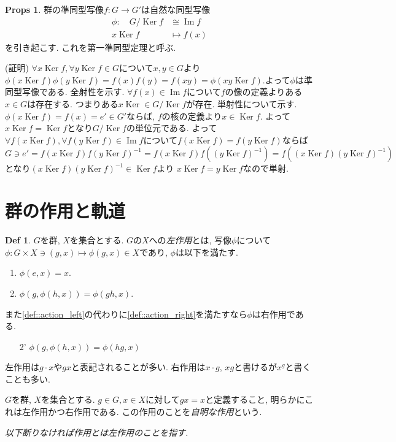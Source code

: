 \documentclass[dvipdfmx]{jsarticle}
\theoremstyle{definition}
\newtheorem{props}{Props}
\newtheorem{definition}{Def}
\numberwithin{equation}{section}
\numberwithin{props}{section}
\numberwithin{definition}{section}
\numberwithin{note}{section}
\DeclareMathOperator{\Ker}{Ker}
\DeclareMathOperator{\Image}{Im}
\begin{document}
\begin{props}
     群の準同型写像$f\colon G\to G'$は自然な同型写像
     \begin{align}
          \phi:\quad G/\Ker f & \cong \Image f \\
          x\Ker f             & \mapsto f(x)
     \end{align}
     を引き起こす. これを第一準同型定理と呼ぶ.
\end{props}
(証明) $\forall x\Ker f , \forall y\Ker f \in G$について$x,y\in G$より$\phi( x\Ker f)\phi( y\Ker f)=f(x)f(y)=f(xy)=\phi( xy\Ker f)$.よって$\phi$は準同型写像である. 全射性を示す. $\forall f(x)\in \Image f$について$f$の像の定義よりある$x\in G$は存在する. つまりある$x\Ker \in G/\Ker f$が存在. 単射性について示す.
$\phi(x\Ker f)=f(x)=e'\in G'$ならば, $f$の核の定義より$x\in \Ker f$. よって$x\Ker f=\Ker f$となり$G/\Ker f$の単位元である. よって$\forall f(x\Ker f),\forall f(y\Ker f)\in \Image f$について$f(x\Ker f)=f(y\Ker f)$ならば
$G\ni e'=f(x\Ker f)f(y\Ker f)^{-1}=f(x\Ker f)f((y\Ker f)^{-1})=f((x\Ker f)(y\Ker f)^{-1})$となり$(x\Ker f)(y\Ker f)^{-1}\in \Ker f$より $x\Ker f= y\Ker f$なので単射.
\section{群の作用と軌道}
\begin{definition}
     $G$を群, $X$を集合とする. $G$の$X$への\emph{左作用}とは, 写像$\phi$について$\phi\colon G\times X\ni (g,x)\mapsto \phi(g,x)\in X$であり, $\phi$は以下を満たす.
     \begin{enumerate}
          \item $\phi(e,x)=x$.
          \item $\phi(g,\phi(h,x))=\phi(gh,x)$. \label{def::action_left}
     \end{enumerate}
     また\ref{def::action_left}の代わりに\ref{def::action_right}を満たすなら$\phi$は右作用である.
     \begin{enumerate}
          \item [2'] $\phi(g,\phi(h,x))=\phi(hg,x)$\label{def::action_right}
     \end{enumerate}
     左作用は$g\cdot x$や$gx$と表記されることが多い. 右作用は$x\cdot g$, $xg$と書けるが$x^g$と書くことも多い.
\end{definition}
$G$を群, $X$を集合とする. $g\in G,x\in X$に対して$gx=x$と定義すること, 明らかにこれは左作用かつ右作用である. この作用のことを\emph{自明な作用}という.

\emph{以下断りなければ作用とは左作用のことを指す.}
\end{document}
